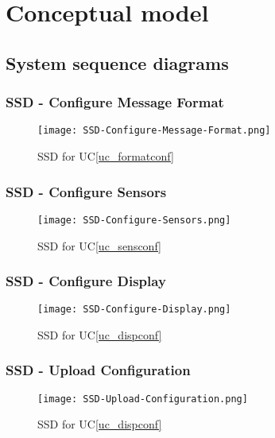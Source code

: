 
\section{Conceptual model}

\subsection{System sequence diagrams}

\subsubsection{SSD - Configure Message Format}
\begin{figure}[!htbp]
  \texttt{[image: SSD-Configure-Message-Format.png]}
  \caption{SSD for UC\vref{uc_formatconf}}
  \label{fig:SSD-Configure-Message-Format}
\end{figure}
\clearpage

\subsubsection{SSD - Configure Sensors}
\begin{figure}[!htbp]
  \ContinuedFloat
  \texttt{[image: SSD-Configure-Sensors.png]}
  \caption{SSD for UC\vref{uc_sensconf}}
  \label{fig:SSD-Configure-Sensors}
\end{figure}
\clearpage

\subsubsection{SSD - Configure Display}
\begin{figure}[!htbp]
  \texttt{[image: SSD-Configure-Display.png]}
  \caption{SSD for UC\vref{uc_dispconf}}
  \label{fig:SSD-Configure-Display}
\end{figure}
\clearpage 


\subsubsection{SSD - Upload Configuration}
\begin{figure}[!htbp]
  \texttt{[image: SSD-Upload-Configuration.png]}
  \caption{SSD for UC\vref{uc_dispconf}}
  \label{fig:SSD-Upload-Configuration}
\end{figure}
\clearpage 


